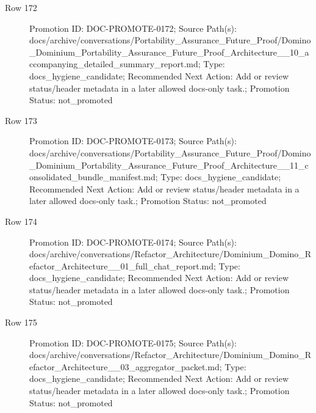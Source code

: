 \documentclass[9pt,a4paper,openany]{book}
\begin{document}
\begin{description}
\item[Row 172] Promotion ID: DOC-\allowbreak{}PROMOTE-\allowbreak{}0172; Source Path(s): docs/\allowbreak{}archive/\allowbreak{}conversations/\allowbreak{}Portability\_\allowbreak{}Assurance\_\allowbreak{}Future\_\allowbreak{}Proof/\allowbreak{}Domino\_\allowbreak{}Dominium\_\allowbreak{}Portability\_\allowbreak{}Assurance\_\allowbreak{}Future\_\allowbreak{}Proof\_\allowbreak{}Architecture\_\allowbreak{}\_\allowbreak{}10\_\allowbreak{}accompanying\_\allowbreak{}detailed\_\allowbreak{}summary\_\allowbreak{}report.\allowbreak{}md; Type: docs\_\allowbreak{}hygiene\_\allowbreak{}candidate; Recommended Next Action: Add or review status/\allowbreak{}header metadata in a later allowed docs-\allowbreak{}only task.\allowbreak{}; Promotion Status: not\_\allowbreak{}promoted
\item[Row 173] Promotion ID: DOC-\allowbreak{}PROMOTE-\allowbreak{}0173; Source Path(s): docs/\allowbreak{}archive/\allowbreak{}conversations/\allowbreak{}Portability\_\allowbreak{}Assurance\_\allowbreak{}Future\_\allowbreak{}Proof/\allowbreak{}Domino\_\allowbreak{}Dominium\_\allowbreak{}Portability\_\allowbreak{}Assurance\_\allowbreak{}Future\_\allowbreak{}Proof\_\allowbreak{}Architecture\_\allowbreak{}\_\allowbreak{}11\_\allowbreak{}consolidated\_\allowbreak{}bundle\_\allowbreak{}manifest.\allowbreak{}md; Type: docs\_\allowbreak{}hygiene\_\allowbreak{}candidate; Recommended Next Action: Add or review status/\allowbreak{}header metadata in a later allowed docs-\allowbreak{}only task.\allowbreak{}; Promotion Status: not\_\allowbreak{}promoted
\item[Row 174] Promotion ID: DOC-\allowbreak{}PROMOTE-\allowbreak{}0174; Source Path(s): docs/\allowbreak{}archive/\allowbreak{}conversations/\allowbreak{}Refactor\_\allowbreak{}Architecture/\allowbreak{}Dominium\_\allowbreak{}Domino\_\allowbreak{}Refactor\_\allowbreak{}Architecture\_\allowbreak{}\_\allowbreak{}01\_\allowbreak{}full\_\allowbreak{}chat\_\allowbreak{}report.\allowbreak{}md; Type: docs\_\allowbreak{}hygiene\_\allowbreak{}candidate; Recommended Next Action: Add or review status/\allowbreak{}header metadata in a later allowed docs-\allowbreak{}only task.\allowbreak{}; Promotion Status: not\_\allowbreak{}promoted
\item[Row 175] Promotion ID: DOC-\allowbreak{}PROMOTE-\allowbreak{}0175; Source Path(s): docs/\allowbreak{}archive/\allowbreak{}conversations/\allowbreak{}Refactor\_\allowbreak{}Architecture/\allowbreak{}Dominium\_\allowbreak{}Domino\_\allowbreak{}Refactor\_\allowbreak{}Architecture\_\allowbreak{}\_\allowbreak{}03\_\allowbreak{}aggregator\_\allowbreak{}packet.\allowbreak{}md; Type: docs\_\allowbreak{}hygiene\_\allowbreak{}candidate; Recommended Next Action: Add or review status/\allowbreak{}header metadata in a later allowed docs-\allowbreak{}only task.\allowbreak{}; Promotion Status: not\_\allowbreak{}promoted

\end{description}
\end{document}
